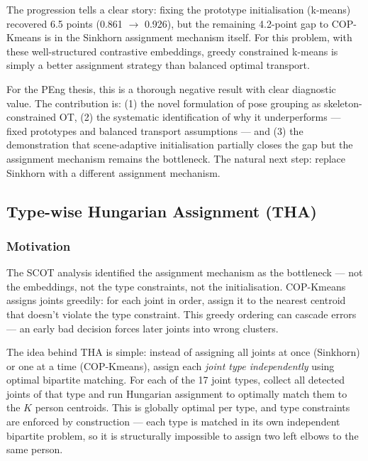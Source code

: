 \vspace{0.5em}

The progression tells a clear story: fixing the prototype initialisation (k-means) recovered 6.5 points (0.861 $\to$ 0.926), but the remaining 4.2-point gap to COP-Kmeans is in the Sinkhorn assignment mechanism itself. For this problem, with these well-structured contrastive embeddings, greedy constrained k-means is simply a better assignment strategy than balanced optimal transport.

For the PEng thesis, this is a thorough negative result with clear diagnostic value. The contribution is: (1) the novel formulation of pose grouping as skeleton-constrained OT, (2) the systematic identification of why it underperforms --- fixed prototypes and balanced transport assumptions --- and (3) the demonstration that scene-adaptive initialisation partially closes the gap but the assignment mechanism remains the bottleneck. The natural next step: replace Sinkhorn with a different assignment mechanism.


\subsection{Type-wise Hungarian Assignment (THA)}

\subsubsection{Motivation}

The SCOT analysis identified the assignment mechanism as the bottleneck --- not the embeddings, not the type constraints, not the initialisation. COP-Kmeans assigns joints greedily: for each joint in order, assign it to the nearest centroid that doesn't violate the type constraint. This greedy ordering can cascade errors --- an early bad decision forces later joints into wrong clusters.

The idea behind THA is simple: instead of assigning all joints at once (Sinkhorn) or one at a time (COP-Kmeans), assign each \emph{joint type independently} using optimal bipartite matching. For each of the 17 joint types, collect all detected joints of that type and run Hungarian assignment to optimally match them to the $K$ person centroids. This is globally optimal per type, and type constraints are enforced by construction --- each type is matched in its own independent bipartite problem, so it is structurally impossible to assign two left elbows to the same person.

